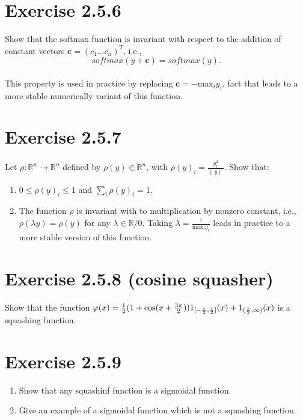 \documentclass{exam}
\begin{document}
\section*{Exercise 2.5.6}
Show that the softmax function is invariant with respect to the addition of constant vectors $\pmb{c} = (c_1 \ldots c_n)^{T}$, i.e., \\
\begin{equation*}
    softmax(y + \pmb{c}) = softmax(y).
\end{equation*}\\
This property is used in practice by replacing $\pmb{c} = - \text{max}_i y_i$, fact that leads to a more stable numerically variant of this function.

\section*{Exercise 2.5.7}
Let $\rho: \mathbb{R}^n \rightarrow \mathbb{R}^n$ defined by $\rho(y) \in \mathbb{R}^n$, with $\rho(y)_i = \frac{y^2_i}{\lVert y \rVert }$. Show that: 
\begin{enumerate}
    \item $0 \leq \rho(y)_i \leq 1$ and $\sum_i \rho(y)_i = 1$.
    \item The function $\rho$ is invariant with to multiplication by nonzero constant, i.e., $\rho(\lambda y ) = \rho(y)$ for any $\lambda \in \mathbb{R}/{0}$. Taking $\lambda = \frac{1}{\text{max}_i y_i}$ leads in practice to a more stable version of this function. 
\end{enumerate}

\section*{Exercise 2.5.8 (cosine squasher)}
Show that the function $\varphi(x) = \frac{1}{2}(1 + \text{cos}(x + \frac{3\pi}{2}))1_{\tiny [-\frac{\pi}{2}, \frac{\pi}{2}]}(x) + 1_{\tiny (\frac{\pi}{2}, \infty)}(x)$ is a 
squashing function.

\section*{Exercise 2.5.9}
\begin{enumerate}
    \item Show that any squashinf function is a sigmoidal function.
    \item Give an example of a sigmoidal function which is not a squashing function.
\end{enumerate}
\end{document}
